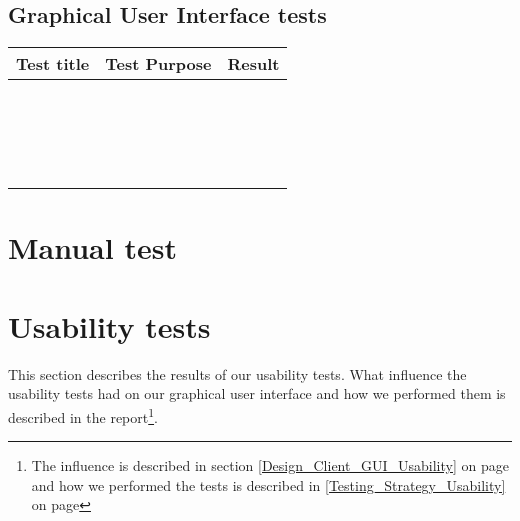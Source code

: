 \subsection{Graphical User Interface tests}
\label{Appendix_Test_Table_GUI}
\begin{centering}
\begin{longtable}{| p{5 cm} | p{7 cm} | c |}
\hline
Test title & Test Purpose & Result\\
\hline
 & & \\
\hline
 & & \\
\hline
 & & \\
\hline
 & & \\
\hline
 & & \\
\hline
 & & \\
\hline
 & & \\
\hline
 & & \\
\hline
 & & \\
\hline
 & & \\
\hline
 & & \\
\hline
 & & \\
\hline
 & & \\
\hline
 & & \\
\hline
 & & \\
\hline
 & & \\
\hline
 & & \\
\hline
 & & \\
\hline
\end{longtable}
\end{centering}
\section{Manual test}
\label{Appendix_Test_Manual}

\section{Usability tests}
\label{Appendix_Test_Usability}
This section describes the results of our usability tests. What influence the usability tests had on our graphical user interface and how we performed them is described in the report\footnote{The influence is described in section \ref {Design_Client_GUI_Usability} on page \pageref{Design_Client_GUI_Usability} and how we performed the tests is described in \ref{Testing_Strategy_Usability} on page \pageref{Testing_Strategy_Usability}}.